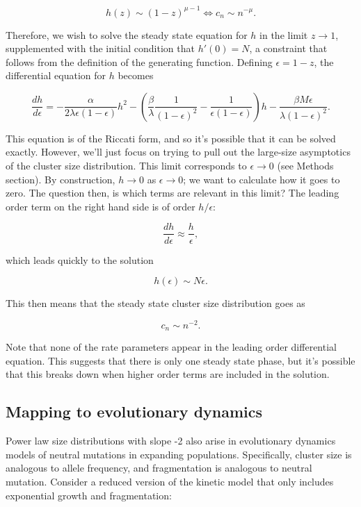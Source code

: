 \documentclass[12pt]{article}
\def\be{\begin{equation}}
\def\ee{\end{equation}}
\begin{document}
\be
h(z) \sim (1-z)^{\mu-1} \Longleftrightarrow c_n \sim n^{-\mu}.
\ee



Therefore, we wish to solve the steady state equation for $h$ in the limit $z\to 1$, supplemented with the initial condition that $h'(0) = N$, a constraint that follows from the definition of the generating function. Defining $\epsilon = 1- z$, the differential equation for $h$ becomes

\be
\frac{dh}{d\epsilon}= -\frac{\alpha}{2\lambda\epsilon(1-\epsilon)}h^2 - \left( \frac{\beta}{\lambda}\frac{1}{(1-\epsilon)^2} - \frac{1}{\epsilon(1-\epsilon)}\right)h - \frac{\beta M\epsilon}{\lambda(1-\epsilon)^2}.
\ee

\noindent This equation is of the Riccati form, and so it's possible that it can be solved exactly. However, we'll just focus on trying to pull out the large-size asymptotics of the cluster size distribution. This limit corresponds to $\epsilon \to 0$ (see Methods section). By construction, $h\to 0$ as $\epsilon\to 0$; we want to calculate how it goes to zero.  The question then, is which terms are relevant in this limit? The leading order term on the right hand side is of order $h/\epsilon$: 

\be
\frac{dh}{d\epsilon}\approx \frac{h}{\epsilon},
\ee

\noindent which leads quickly to the solution


\be
h(\epsilon) \sim N\epsilon.
\ee

\noindent This then means that the steady state cluster size distribution goes as 

\be
c_n \sim n^{-2}.
\ee

\noindent Note that none of the rate parameters appear in the leading order differential equation. This suggests that there is only one steady state phase, but it's possible that this breaks down when higher order terms are included in the solution.


\subsection*{Mapping to evolutionary dynamics}

Power law size distributions with slope -2 also arise in evolutionary dynamics models of neutral mutations in expanding populations. Specifically, cluster size is analogous to allele frequency, and fragmentation is analogous to neutral mutation. Consider a reduced version of the kinetic model that only includes exponential growth and fragmentation:
\end{document}
